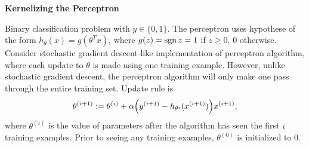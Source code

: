 \documentclass[12pt,letterpaper,boxed]{hmcpset}
\begin{document}
\begin{problem}[Problem 5]
  \textbf{Kernelizing the Perceptron}

  Binary classification problem with $y \in \{0,1\}$. The perceptron uses hypothese of the form $h_\theta(x) = g(\theta^T x)$, where $g(z) = \operatorname{sgn}{z} = 1$ if $z \geq 0$, $0$ otherwise. Consider stochastic gradient descent-like implementation of perceptron algorithm, where each update to $\theta$ is made using one training example. However, unlike stochastic gradient descent, the perceptron algorithm will only make one pass through the entire training set. Update rule is
  \[
  \theta^{(i+1)} := \theta^{(i)} + \alpha \qty(y^{(i+1)} - h_{\theta^{i}}(x^{(i+1)})) x^{(i+1)},
  \]
  where $\theta^{(i)}$ is the value of parameters after the algorithm has seen the first $i$ training examples. Prior to seeing any training examples, $\theta^(0)$ is initialized to $0$.
\end{problem}
\end{document}
